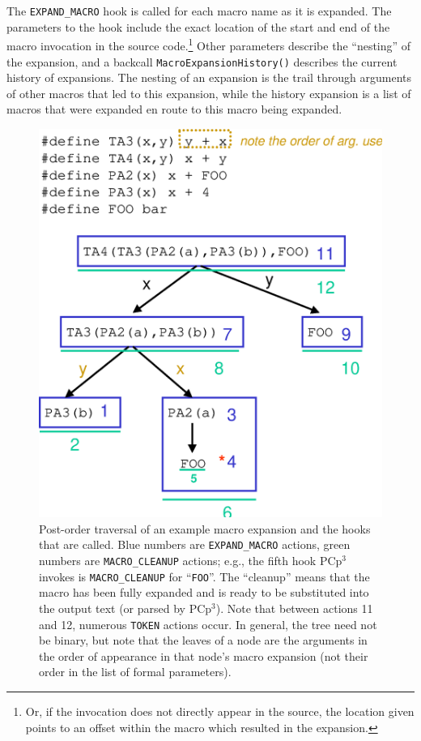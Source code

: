 \documentclass{article}
\newcommand{\pcp}{\mbox{\textsf{PCp}$^3$}}
\newcommand{\eg}{e.g.,}
\begin{document}
\noindent The \texttt{EXPAND\_MACRO} hook is called for each macro name as it is
expanded.  The parameters to the hook include the exact location of the
start and end of the macro invocation in the source code.\footnote{Or,
  if the invocation does not directly appear in the source, the location
  given points to an offset within the macro which resulted in the
  expansion.}  Other parameters describe the ``nesting'' of the
expansion, and a backcall \texttt{Macro\-Expansion\-History()} describes the
current history of expansions.  The nesting of an expansion is the trail
through arguments of other macros that led to this expansion, while the
history expansion is a list of macros that were expanded en route to
this macro being expanded.

\begin{figure}[p]
  \begin{center}
    \leavevmode
    \includegraphics[width=0.45\linewidth]{figs/tree-expn.eps}
    \caption{Post-order traversal of an example macro expansion and the
      hooks that are called. Blue numbers are \texttt{EXPAND\_MACRO}
      actions, green numbers are \texttt{MACRO\_CLEANUP} actions; \eg{}
      the fifth hook \pcp{} invokes is \texttt{MACRO\_CLEANUP} for
      ``\texttt{FOO}''.  The ``cleanup'' means that the macro has been
      fully expanded and is ready to be substituted into the output text
      (or parsed by \pcp{}). Note that between actions 11 and 12, numerous
      \texttt{TOKEN} actions occur.  In general, the tree need not be
      binary, but note that the leaves of a node are the arguments in
      the order of appearance in that node's macro expansion (not their
      order in the list of formal parameters).}
    \label{fig:tree-expn}
  \end{center}
\end{figure}
\end{document}
